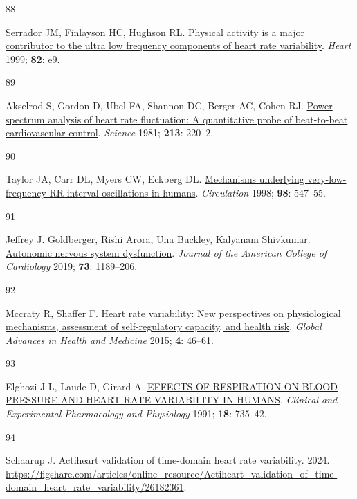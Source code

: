 \documentclass[
  a4paper,
  headsepline=true,
  open=left]{scrbook}
\newlength{\cslhangindent}
\newlength{\csllabelwidth}
\newlength{\cslentryspacingunit} %
\newenvironment{CSLReferences}[2] %
 {%
  \setlength{\parindent}{0pt}
  \ifodd #1
  \let\oldpar\par
  \def\par{\hangindent=\cslhangindent\oldpar}
  \fi
  \setlength{\parskip}{#2\cslentryspacingunit}
 }%
 {}
\newcommand{\CSLLeftMargin}[1]{\parbox[t]{\csllabelwidth}{#1}}
\newcommand{\CSLRightInline}[1]{\parbox[t]{\linewidth - \csllabelwidth}{#1}\break}
\begin{document}
\begin{CSLReferences}{0}{0}
\leavevmode{}%
\CSLLeftMargin{88 }%
\CSLRightInline{Serrador JM, Finlayson HC, Hughson RL.
\href{https://doi.org/10.1136/hrt.82.6.e9}{Physical activity is a major
contributor to the ultra low frequency components of heart rate
variability}. \emph{Heart} 1999; \textbf{82}: e9.}

\leavevmode{}%
\CSLLeftMargin{89 }%
\CSLRightInline{Akselrod S, Gordon D, Ubel FA, Shannon DC, Berger AC,
Cohen RJ. \href{https://doi.org/10.1126/science.6166045}{Power spectrum
analysis of heart rate fluctuation: A quantitative probe of beat-to-beat
cardiovascular control}. \emph{Science} 1981; \textbf{213}: 220--2.}

\leavevmode{}%
\CSLLeftMargin{90 }%
\CSLRightInline{Taylor JA, Carr DL, Myers CW, Eckberg DL.
\href{https://doi.org/10.1161/01.CIR.98.6.547}{Mechanisms underlying
very-low-frequency RR-interval oscillations in humans}.
\emph{Circulation} 1998; \textbf{98}: 547--55.}

\leavevmode{}%
\CSLLeftMargin{91 }%
\CSLRightInline{Jeffrey J. Goldberger, Rishi Arora, Una Buckley,
Kalyanam Shivkumar.
\href{https://doi.org/doi:10.1016/j.jacc.2018.12.064}{Autonomic nervous
system dysfunction}. \emph{Journal of the American College of
Cardiology} 2019; \textbf{73}: 1189--206.}

\leavevmode{}%
\CSLLeftMargin{92 }%
\CSLRightInline{Mccraty R, Shaffer F.
\href{https://doi.org/10.7453/gahmj.2014.073}{Heart rate variability:
New perspectives on physiological mechanisms, assessment of
self-regulatory capacity, and health risk}. \emph{Global Advances in
Health and Medicine} 2015; \textbf{4}: 46--61.}

\leavevmode{}%
\CSLLeftMargin{93 }%
\CSLRightInline{Elghozi J-L, Laude D, Girard A.
\href{https://doi.org/10.1111/j.1440-1681.1991.tb01391.x}{EFFECTS OF
RESPIRATION ON BLOOD PRESSURE AND HEART RATE VARIABILITY IN HUMANS}.
\emph{Clinical and Experimental Pharmacology and Physiology} 1991;
\textbf{18}: 735--42.}

\leavevmode{}%
\CSLLeftMargin{94 }%
\CSLRightInline{Schaarup J. Actiheart validation of time-domain heart
rate variability. 2024.
\url{https://figshare.com/articles/online_resource/Actiheart_validation_of_time-domain_heart_rate_variability/26182361}.}


\end{CSLReferences}
\end{document}
